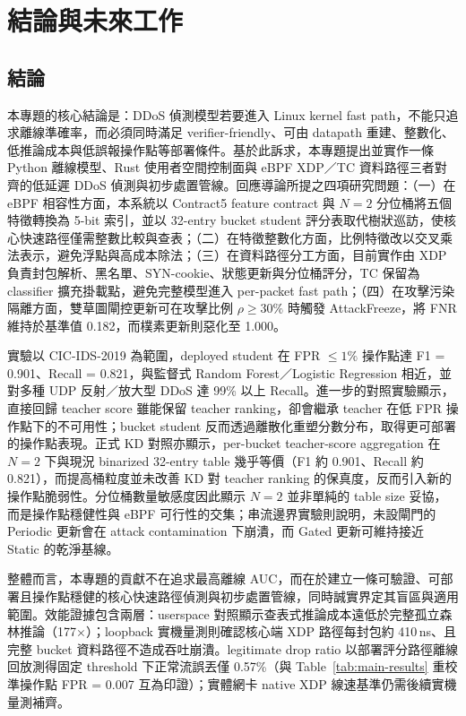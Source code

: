 \documentclass[12pt, a4paper, fontset=none]{ctexart}
\begin{document}
\newpage
\section{結論與未來工作}
\label{sec:conclusion}

\subsection{結論}
本專題的核心結論是：DDoS 偵測模型若要進入 Linux kernel fast path，不能只追求離線準確率，而必須同時滿足 verifier-friendly、可由 datapath 重建、整數化、低推論成本與低誤報操作點等部署條件。基於此訴求，本專題提出並實作一條 Python 離線模型、Rust 使用者空間控制面與 eBPF XDP／TC 資料路徑三者對齊的低延遲 DDoS 偵測與初步處置管線。回應導論所提之四項研究問題：（一）在 eBPF 相容性方面，本系統以 Contract5 feature contract 與 $N=2$ 分位桶將五個特徵轉換為 5-bit 索引，並以 32-entry bucket student 評分表取代樹狀巡訪，使核心快速路徑僅需整數比較與查表；（二）在特徵整數化方面，比例特徵改以交叉乘法表示，避免浮點與高成本除法；（三）在資料路徑分工方面，目前實作由 XDP 負責封包解析、黑名單、SYN-cookie、狀態更新與分位桶評分，TC 保留為 classifier 擴充掛載點，避免完整模型進入 per-packet fast path；（四）在攻擊污染隔離方面，雙草圖閘控更新可在攻擊比例 $\rho \geq 30\%$ 時觸發 AttackFreeze，將 FNR 維持於基準值 0.182，而樸素更新則惡化至 1.000。

實驗以 CIC-IDS-2019 為範圍，deployed student 在 FPR $\leq 1\%$ 操作點達 F1 = 0.901、Recall = 0.821，與監督式 Random Forest／Logistic Regression 相近，並對多種 UDP 反射／放大型 DDoS 達 99\% 以上 Recall。進一步的對照實驗顯示，直接回歸 teacher score 雖能保留 teacher ranking，卻會繼承 teacher 在低 FPR 操作點下的不可用性；bucket student 反而透過離散化重塑分數分布，取得更可部署的操作點表現。正式 KD 對照亦顯示，per-bucket teacher-score aggregation 在 $N=2$ 下與現況 binarized 32-entry table 幾乎等價（F1 約 0.901、Recall 約 0.821），而提高桶粒度並未改善 KD 對 teacher ranking 的保真度，反而引入新的操作點脆弱性。分位桶數量敏感度因此顯示 $N=2$ 並非單純的 table size 妥協，而是操作點穩健性與 eBPF 可行性的交集；串流邊界實驗則說明，未設閘門的 Periodic 更新會在 attack contamination 下崩潰，而 Gated 更新可維持接近 Static 的乾淨基線。

整體而言，本專題的貢獻不在追求最高離線 AUC，而在於建立一條可驗證、可部署且操作點穩健的核心快速路徑偵測與初步處置管線，同時誠實界定其盲區與適用範圍。效能證據包含兩層：userspace 對照顯示查表式推論成本遠低於完整孤立森林推論（177$\times$）；loopback 實機量測則確認核心端 XDP 路徑每封包約 410\,ns、且完整 bucket 資料路徑不造成吞吐崩潰。legitimate drop ratio 以部署評分路徑離線回放測得固定 threshold 下正常流誤丟僅 0.57\%（與 Table~\ref{tab:main-results} 重校準操作點 FPR = 0.007 互為印證）；實體網卡 native XDP 線速基準仍需後續實機量測補齊。
\end{document}

